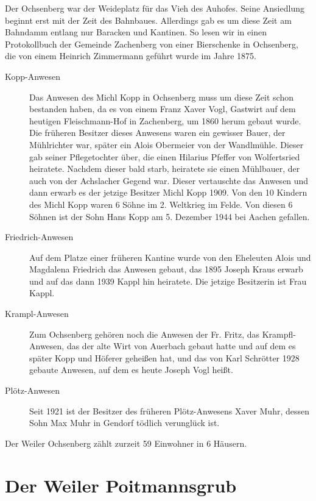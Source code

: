 \documentclass[12pt,a4pager]{book}
\begin{document}
Der Ochsenberg war der Weideplatz für das Vieh des Auhofes. Seine Ansiedlung
beginnt erst mit der Zeit des Bahnbaues. Allerdings gab es um diese Zeit am
Bahndamm entlang nur Baracken und Kantinen. So lesen wir in einen Protokollbuch
der Gemeinde Zachenberg von einer Bierschenke in Ochsenberg, die von einem
Heinrich Zimmermann geführt wurde im Jahre 1875.

\begin{description}
\item[Kopp-Anwesen] Das Anwesen des Michl Kopp in Ochsenberg muss um diese Zeit
schon bestanden haben, da es von einem Franz Xaver Vogl, Gastwirt auf dem
heutigen Fleischmann-Hof in Zachenberg, um 1860 herum gebaut wurde. Die früheren
Besitzer dieses Anwesens waren ein gewisser Bauer, der Mühlrichter war, später
ein Alois Obermeier von der Wandlmühle. Dieser gab seiner Pflegetochter über,
die einen Hilarius Pfeffer von Wolfertsried heiratete. Nachdem dieser bald
starb, heiratete sie einen Mühlbauer, der auch von der Achslacher Gegend war.
Dieser vertauschte das Anwesen und dann erwarb es der jetzige Besitzer Michl
Kopp 1909. Von den 10 Kindern des Michl Kopp waren 6 Söhne im 2. Weltkrieg im
Felde. Von diesen 6 Söhnen ist der Sohn Hans Kopp am 5. Dezember 1944 bei Aachen
gefallen.

\item[Friedrich-Anwesen] Auf dem Platze einer früheren Kantine wurde von den
Eheleuten Alois und Magdalena Friedrich das Anwesen gebaut, das 1895 Joseph
Kraus erwarb und auf das dann 1939 Kappl hin heiratete. Die jetzige Besitzerin
ist Frau Kappl.

\item[Krampl-Anwesen] Zum Ochsenberg gehören noch die Anwesen der Fr. Fritz, das
Krampfl-Anwesen, das der alte Wirt von Auerbach gebaut hatte und auf dem es
später Kopp und Höferer geheißen hat, und das von Karl Schrötter 1928 gebaute
Anwesen, auf dem es heute Joseph Vogl heißt.

\item[Plötz-Anwesen] Seit 1921 ist der Besitzer des früheren Plötz-Anwesens
Xaver Muhr, dessen Sohn Max Muhr in Gendorf tödlich verunglück ist.
\end{description}

Der Weiler Ochsenberg zählt zurzeit 59 Einwohner in 6 Häusern.

\section{Der Weiler Poitmannsgrub}
\end{document}
